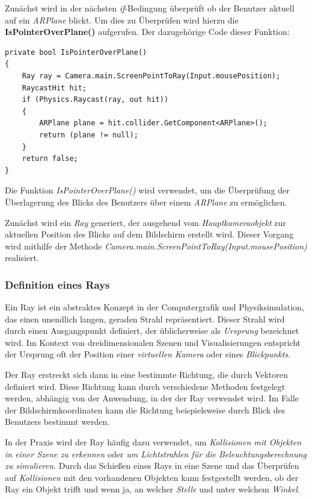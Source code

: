 Zunächst wird in der nächsten \textit{if}-Bedingung überprüft ob der Benutzer aktuell auf ein \textit{ARPlane} blickt.
Um dies zu Überprüfen wird hierzu die \textbf{IsPointerOverPlane()} aufgerufen. Der dazugehörige Code dieser Funktion:
\begin{lstlisting}[style=csharp, caption={Überprüfen ob Benutzer auf ARPlane blickt}, label=code:isPOP]
private bool IsPointerOverPlane()
{
    Ray ray = Camera.main.ScreenPointToRay(Input.mousePosition);
    RaycastHit hit;
    if (Physics.Raycast(ray, out hit))
    {
        ARPlane plane = hit.collider.GetComponent<ARPlane>();
        return (plane != null);
    }
    return false;
}
\end{lstlisting}
Die Funktion \textit{IsPointerOverPlane()} wird verwendet, um die Überprüfung der Überlagerung des Blicks des Benutzers
über einem \textit{ARPlane} zu ermöglichen.

Zunächst wird ein \textit{Ray} generiert, der ausgehend vom \textit{Hauptkameraobjekt} zur aktuellen Position des Blicks
auf dem Bildschirm erstellt wird. Dieser Vorgang wird mithilfe der Methode \textit{Camera.main.ScreenPointToRay(Input.mousePosition)}
realisiert.

\subsubsection*{Definition eines Rays} %
Ein Ray ist ein abstraktes Konzept in der Computergrafik und Physiksimulation, das einen unendlich langen, geraden Strahl
repräsentiert. Dieser Strahl wird durch einen Ausgangspunkt definiert, der üblicherweise als \textit{Ursprung} bezeichnet
wird. Im Kontext von dreidimensionalen Szenen und Visualisierungen entspricht der Ursprung oft der Position einer
\textit{virtuellen Kamera} oder eines \textit{Blickpunkts}.

Der Ray erstreckt sich dann in eine bestimmte Richtung, die durch Vektoren definiert wird. Diese Richtung kann durch
verschiedene Methoden festgelegt werden, abhängig von der Anwendung, in der der Ray verwendet wird. Im Falle der
Bildschirmkoordinaten kann die Richtung beispielsweise durch  Blick des Benutzers bestimmt werden.

In der Praxis wird der Ray häufig dazu verwendet, um \textit{Kollisionen mit Objekten in einer Szene zu erkennen} oder
\textit{um Lichtstrahlen für die Beleuchtungsberechnung zu simulieren}. Durch das Schießen eines Rays in eine Szene und
das Überprüfen auf \textit{Kollisionen} mit den vorhandenen Objekten kann festgestellt werden, ob der Ray ein Objekt
trifft und wenn ja, an welcher \textit{Stelle} und unter welchem \textit{Winkel}.\\


